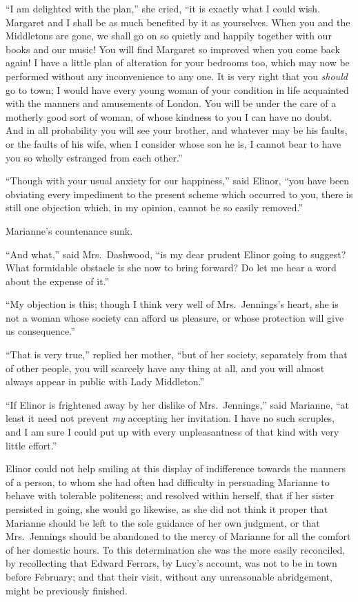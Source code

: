 \documentclass{article}
\begin{document}
``I am delighted with the plan,'' she cried,
``it is exactly what I could wish.  Margaret and I shall
be as much benefited by it as yourselves.  When you
and the Middletons are gone, we shall go on so quietly
and happily together with our books and our music! You
will find Margaret so improved when you come back again!
I have a little plan of alteration for your bedrooms too,
which may now be performed without any inconvenience
to any one.  It is very right that you \emph{should} go to town;
I would have every young woman of your condition in life
acquainted with the manners and amusements of London.
You will be under the care of a motherly good sort
of woman, of whose kindness to you I can have no doubt.
And in all probability you will see your brother,
and whatever may be his faults, or the faults of his wife,
when I consider whose son he is, I cannot bear to have you so
wholly estranged from each other.''

``Though with your usual anxiety for our happiness,''
said Elinor, ``you have been obviating every impediment
to the present scheme which occurred to you, there is
still one objection which, in my opinion, cannot be so
easily removed.''

Marianne's countenance sunk.

``And what,'' said Mrs.\ Dashwood, ``is my dear prudent
Elinor going to suggest?  What formidable obstacle is she
now to bring forward?  Do let me hear a word about the
expense of it.''

``My objection is this; though I think very well of
Mrs.\ Jennings's heart, she is not a woman whose society
can afford us pleasure, or whose protection will give
us consequence.''

``That is very true,'' replied her mother, ``but of
her society, separately from that of other people,
you will scarcely have any thing at all, and you will
almost always appear in public with Lady Middleton.''

``If Elinor is frightened away by her dislike of
Mrs.\ Jennings,'' said Marianne, ``at least it need not prevent
\emph{my} accepting her invitation.  I have no such scruples,
and I am sure I could put up with every unpleasantness
of that kind with very little effort.''

Elinor could not help smiling at this display of
indifference towards the manners of a person, to whom she
had often had difficulty in persuading Marianne to behave
with tolerable politeness; and resolved within herself,
that if her sister persisted in going, she would
go likewise, as she did not think it proper that Marianne
should be left to the sole guidance of her own judgment,
or that Mrs.\ Jennings should be abandoned to the mercy
of Marianne for all the comfort of her domestic hours.
To this determination she was the more easily reconciled,
by recollecting that Edward Ferrars, by Lucy's account,
was not to be in town before February; and that
their visit, without any unreasonable abridgement,
might be previously finished.
\end{document}
